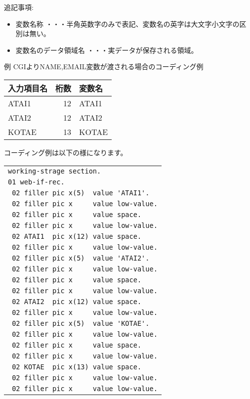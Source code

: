 \vspace{0.5em}

{\small
追記事項:

\begin{itemize}
\item{変数名称 ・・・半角英数字のみで表記、変数名の英字は大文字小文字の区別は無い。}
\item{変数名のデータ領域名 ・・・実データが保存される領域。}
\end{itemize}
}

{\gt 例 CGIよりNAME,EMAIL変数が渡される場合のコーディング例}

\vspace{0.5em}

{\footnotesize
\begin{tabular}{|l|r|l|}
\hline
入力項目名 & 桁数 & 変数名 \\\hline
ATAI1       &  12  & ATAI1  \\\hline
ATAI2       &  12  & ATAI2  \\\hline
KOTAE       &  13  & KOTAE  \\
\hline
\end{tabular}
}
\vspace{1em}

コーディング例は以下の様になります。

\vspace{0.5em}

{\footnotesize
\begin{tabular}{|l|}
\hline
\verb+working-strage section.+\\
\verb+01 web-if-rec.+\\
\verb+ 02 filler pic x(5)  value 'ATAI1'.+\\
\verb+ 02 filler pic x     value low-value.+\\
\verb+ 02 filler pic x     value space.+\\
\verb+ 02 filler pic x     value low-value.+\\
\verb+ 02 ATAI1  pic x(12) value space.+\\
\verb+ 02 filler pic x     value low-value.+\\
\verb+ 02 filler pic x(5)  value 'ATAI2'.+\\
\verb+ 02 filler pic x     value low-value.+\\
\verb+ 02 filler pic x     value space.+\\
\verb+ 02 filler pic x     value low-value.+\\
\verb+ 02 ATAI2  pic x(12) value space.+\\
\verb+ 02 filler pic x     value low-value.+\\
\verb+ 02 filler pic x(5)  value 'KOTAE'.+\\
\verb+ 02 filler pic x     value low-value.+\\
\verb+ 02 filler pic x     value space.+\\
\verb+ 02 filler pic x     value low-value.+\\
\verb+ 02 KOTAE  pic x(13) value space.+\\
\verb+ 02 filler pic x     value low-value.+\\
\verb+ 02 filler pic x     value low-value.+\\
\hline
\end{tabular}
}

